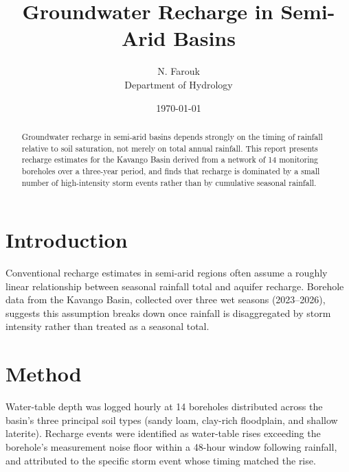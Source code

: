 \documentclass[titlepage]{article}
\title{Groundwater Recharge in Semi-Arid Basins}
\author{N. Farouk \\ Department of Hydrology}
\date{\today}
\begin{document}
\maketitle

\begin{abstract}
Groundwater recharge in semi-arid basins depends strongly on the
timing of rainfall relative to soil saturation, not merely on total
annual rainfall. This report presents recharge estimates for the
Kavango Basin derived from a network of 14 monitoring boreholes over
a three-year period, and finds that recharge is dominated by a small
number of high-intensity storm events rather than by cumulative
seasonal rainfall.
\end{abstract}

\section{Introduction}

Conventional recharge estimates in semi-arid regions often assume a
roughly linear relationship between seasonal rainfall total and
aquifer recharge. Borehole data from the Kavango Basin, collected
over three wet seasons (2023--2026), suggests this assumption breaks
down once rainfall is disaggregated by storm intensity rather than
treated as a seasonal total.

\section{Method}

Water-table depth was logged hourly at 14 boreholes distributed
across the basin's three principal soil types (sandy loam, clay-rich
floodplain, and shallow laterite). Recharge events were identified as
water-table rises exceeding the borehole's measurement noise floor
within a 48-hour window following rainfall, and attributed to the
specific storm event whose timing matched the rise.
\end{document}

